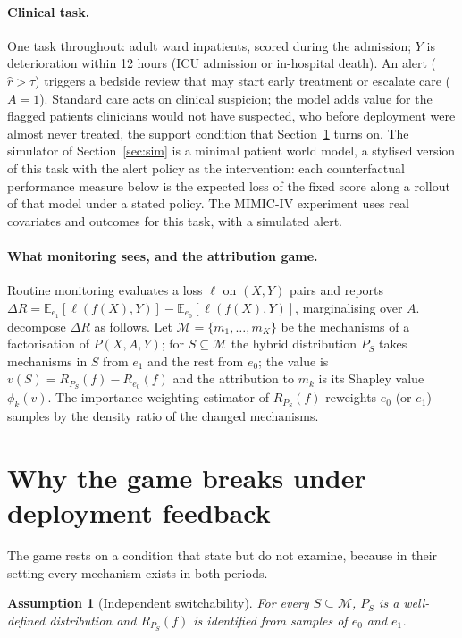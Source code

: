 \documentclass[letterpaper]{article} %
\newtheorem{assumption}{Assumption}
\newcommand{\E}{\mathbb{E}}
\newcommand{\rhat}{\hat r}
\begin{document}
\paragraph{Clinical task.} One task throughout: adult ward inpatients, scored
during the admission; $Y$ is deterioration within 12 hours (ICU admission or
in-hospital death). An alert ($\rhat > \tau$) triggers a bedside review that
may start early treatment or escalate care ($A = 1$). Standard care acts on
clinical suspicion; the model adds value for the flagged
patients clinicians would not have suspected, who before deployment
were almost never treated, the support condition that Section~\ref{sec:break}
turns on. The simulator of Section~\ref{sec:sim} is a minimal patient world model, a
stylised version of this task with the alert policy as the intervention: each counterfactual
performance measure below is the expected loss of the fixed score along a
rollout of that model under a stated policy. The MIMIC-IV experiment uses
real covariates and outcomes for this task, with a simulated alert.

\paragraph{What monitoring sees, and the attribution game.} Routine
monitoring evaluates a loss $\ell$ on $(X, Y)$ pairs and reports
$\Delta R = \E_{e_1}[\ell(f(X), Y)] - \E_{e_0}[\ell(f(X), Y)]$, marginalising
over $A$. \citet{zhang2023attributing} decompose $\Delta R$ as follows. Let
$\mathcal{M} = \{m_1, \ldots, m_K\}$ be the mechanisms of a factorisation of
$P(X, A, Y)$; for $S \subseteq \mathcal{M}$ the hybrid distribution $P_S$
takes mechanisms in $S$ from $e_1$ and the rest from $e_0$; the value is
$v(S) = R_{P_S}(f) - R_{e_0}(f)$ and the attribution to $m_k$ is its Shapley
value $\phi_k(v)$. The importance-weighting estimator of $R_{P_S}(f)$
reweights $e_0$ (or $e_1$) samples by the density ratio of the changed
mechanisms.

\section{Why the game breaks under deployment feedback}
\label{sec:break}

The game rests on a condition that \citet{zhang2023attributing} state but do
not examine, because in their setting every mechanism exists in both periods.

\begin{assumption}[Independent switchability]
\label{ass:switch}
For every $S \subseteq \mathcal{M}$, $P_S$ is a well-defined distribution and
$R_{P_S}(f)$ is identified from samples of $e_0$ and $e_1$.
\end{assumption}
\end{document}

